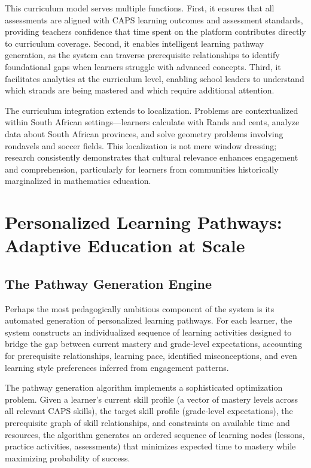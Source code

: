 \documentclass[12pt,a4paper]{article}
\begin{document}
This curriculum model serves multiple functions. First, it ensures that all assessments are aligned with CAPS learning outcomes and assessment standards, providing teachers confidence that time spent on the platform contributes directly to curriculum coverage. Second, it enables intelligent learning pathway generation, as the system can traverse prerequisite relationships to identify foundational gaps when learners struggle with advanced concepts. Third, it facilitates analytics at the curriculum level, enabling school leaders to understand which strands are being mastered and which require additional attention.

The curriculum integration extends to localization. Problems are contextualized within South African settings---learners calculate with Rands and cents, analyze data about South African provinces, and solve geometry problems involving rondavels and soccer fields. This localization is not mere window dressing; research consistently demonstrates that cultural relevance enhances engagement and comprehension, particularly for learners from communities historically marginalized in mathematics education.

\section{Personalized Learning Pathways: Adaptive Education at Scale}

\subsection{The Pathway Generation Engine}

Perhaps the most pedagogically ambitious component of the system is its automated generation of personalized learning pathways. For each learner, the system constructs an individualized sequence of learning activities designed to bridge the gap between current mastery and grade-level expectations, accounting for prerequisite relationships, learning pace, identified misconceptions, and even learning style preferences inferred from engagement patterns.

The pathway generation algorithm implements a sophisticated optimization problem. Given a learner's current skill profile (a vector of mastery levels across all relevant CAPS skills), the target skill profile (grade-level expectations), the prerequisite graph of skill relationships, and constraints on available time and resources, the algorithm generates an ordered sequence of learning nodes (lessons, practice activities, assessments) that minimizes expected time to mastery while maximizing probability of success.
\end{document}

